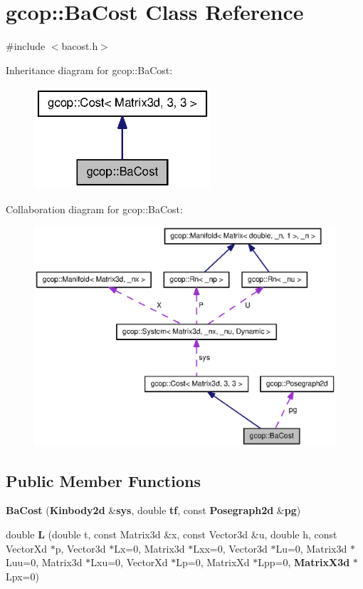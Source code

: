 \section{gcop\-:\-:\-Ba\-Cost \-Class \-Reference}
\label{classgcop_1_1BaCost}


{\ttfamily \#include $<$bacost.\-h$>$}



\-Inheritance diagram for gcop\-:\-:\-Ba\-Cost\-:
\nopagebreak
\begin{figure}[H]
\begin{center}
\leavevmode
\includegraphics[width=186pt]{classgcop_1_1BaCost__inherit__graph}
\end{center}
\end{figure}


\-Collaboration diagram for gcop\-:\-:\-Ba\-Cost\-:
\nopagebreak
\begin{figure}[H]
\begin{center}
\leavevmode
\includegraphics[width=350pt]{classgcop_1_1BaCost__coll__graph}
\end{center}
\end{figure}
\subsection*{\-Public \-Member \-Functions}
\begin{DoxyCompactItemize}
\item 
{\bf \-Ba\-Cost} ({\bf \-Kinbody2d} \&{\bf sys}, double {\bf tf}, const {\bf \-Posegraph2d} \&{\bf pg})
\item 
double {\bf \-L} (double t, const \-Matrix3d \&x, const \-Vector3d \&u, double h, const \-Vector\-Xd $\ast$p, \-Vector3d $\ast$\-Lx=0, \-Matrix3d $\ast$\-Lxx=0, \-Vector3d $\ast$\-Lu=0, \-Matrix3d $\ast$\-Luu=0, \-Matrix3d $\ast$\-Lxu=0, \-Vector\-Xd $\ast$\-Lp=0, \-Matrix\-Xd $\ast$\-Lpp=0, {\bf \-Matrix\-X3d} $\ast$\-Lpx=0)
\end{DoxyCompactItemize}

